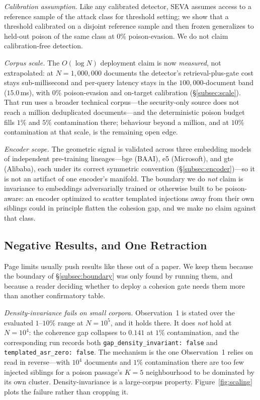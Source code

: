 \documentclass[10pt,journal,compsoc]{IEEEtran}
\begin{document}
\emph{Calibration assumption.} Like any calibrated detector, SEVA assumes access
to a reference sample of the attack class for threshold setting; we show that a
threshold calibrated on a disjoint reference sample and then frozen generalizes to
held-out poison of the same class at $0\%$ poison-evasion.
We do not claim calibration-free detection.

\emph{Corpus scale.} The $O(\log N)$ deployment claim is now \emph{measured}, not
extrapolated: at $N=1{,}000{,}000$ documents the detector's retrieval-plus-gate cost
stays sub-millisecond and per-query latency stays in the $100{,}000$-document band
($15.0$\,ms), with $0\%$ poison-evasion and on-target calibration
(\S\ref{subsec:scale}). That run uses a broader technical corpus---the security-only
source does not reach a million deduplicated documents---and the deterministic poison
budget fills $1\%$ and $5\%$ contamination there; behaviour beyond a million, and at
$10\%$ contamination at that scale, is the remaining open edge.

\emph{Encoder scope.} The geometric signal is validated across three embedding models
of independent pre-training lineages---bge (BAAI), e5 (Microsoft), and gte (Alibaba),
each under its correct symmetric convention (\S\ref{subsec:encoder})---so it is not an
artifact of one encoder's manifold. The boundary we do \emph{not} claim is invariance
to embeddings adversarially trained or otherwise built to be poison-aware: an encoder
optimized to scatter templated injections away from their own siblings could in
principle flatten the cohesion gap, and we make no claim against that class.

\subsection{Negative Results, and One Retraction}
\label{app:negative}
Page limits usually push results like these out of a paper. We keep them because the boundary of
\S\ref{subsec:boundary} was only found by running them, and because a reader deciding whether to
deploy a cohesion gate needs them more than another confirmatory table.

\emph{Density-invariance fails on small corpora.} Observation~1 is stated over the evaluated
$1$--$10\%$ range at $N=10^5$, and it holds there. It does \emph{not} hold at $N=10^4$: the
coherence gap collapses to $0.141$ at $1\%$ contamination, and the corresponding run records both
\texttt{gap\_density\_invariant: false} and \texttt{templated\_asr\_zero: false}. The mechanism is
the one Observation~1 relies on read in reverse---with $10^4$ documents and $1\%$ contamination
there are too few injected siblings for a poison passage's $K=5$ neighbourhood to be dominated by
its own cluster. Density-invariance is a large-corpus property. Figure~\ref{fig:scaling} plots
the failure rather than cropping it.
\end{document}
